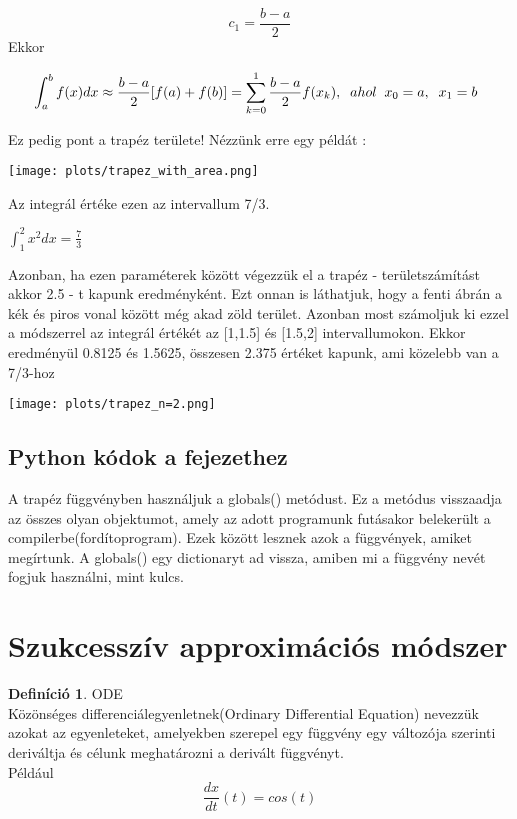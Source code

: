 \documentclass{article}
\theoremstyle{definition}
\theoremstyle{theorem}
\newtheorem{definition}{Definíció}
\begin{document}
\begin{equation*}
c_1 = \frac{b-a}{2}
\end{equation*}
Ekkor

\begin{equation*}
    \int_a^b f(x) dx \approx \frac{b-a}{2}[f(a) + f(b)] = \sum_{k=0}^{1} \frac{b-a}{2} f(x_k),\\
    \;\;ahol \;\;x_0 = a,\;\;x_1=b
    \;\;
\end{equation*}

Ez pedig pont a trapéz területe! Nézzünk erre egy példát :
\newline

\texttt{[image: plots/trapez\_with\_area.png]}

Az integrál értéke ezen az intervallum 7/3.
\begin{center}
$\int_{1}^{2} x ^2 dx = \frac{7}{3}$
\end{center}
Azonban, ha ezen paraméterek között végezzük el a trapéz - területszámítást akkor 2.5 - t kapunk eredményként. Ezt onnan is láthatjuk, hogy a fenti ábrán a kék és piros vonal között még akad zöld terület. Azonban most számoljuk ki ezzel a módszerrel az integrál értékét az [1,1.5] és [1.5,2] intervallumokon. Ekkor eredményül 0.8125 és 1.5625, összesen 2.375 értéket kapunk, ami közelebb van a 7/3-hoz

\texttt{[image: plots/trapez\_n=2.png]}

\subsection{Python kódok a fejezethez}
A trapéz függvényben használjuk a globals() metódust. Ez a metódus visszaadja az összes olyan objektumot, amely az adott programunk futásakor belekerült a compilerbe(fordítoprogram). Ezek között lesznek azok a függvények, amiket megírtunk. A globals() egy dictionaryt ad vissza, amiben mi a függvény nevét fogjuk használni, mint kulcs.
\pagebreak


\section{Szukcesszív approximációs módszer}

\begin{definition}{ODE}\\
Közönséges differenciálegyenletnek(Ordinary Differential Equation) nevezzük azokat az egyenleteket, amelyekben szerepel egy függvény egy változója szerinti deriváltja és célunk meghatározni a derivált függvényt.\\
Például
\begin{equation*}
    \frac{dx}{dt} (t) = cos(t)
\end{equation*}
\end{definition}
\end{document}
